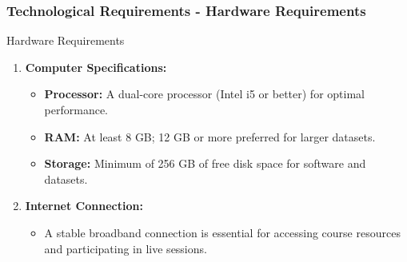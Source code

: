 \documentclass[aspectratio=169]{beamer}
\begin{document}
\begin{frame}[fragile]
    \frametitle{Technological Requirements - Hardware Requirements}
    \begin{block}{Hardware Requirements}
        \begin{enumerate}
            \item \textbf{Computer Specifications:}
            \begin{itemize}
                \item \textbf{Processor:} A dual-core processor (Intel i5 or better) for optimal performance.
                \item \textbf{RAM:} At least 8 GB; 12 GB or more preferred for larger datasets.
                \item \textbf{Storage:} Minimum of 256 GB of free disk space for software and datasets.
            \end{itemize}
            \item \textbf{Internet Connection:}
            \begin{itemize}
                \item A stable broadband connection is essential for accessing course resources and participating in live sessions.
            \end{itemize}
        \end{enumerate}
    \end{block}
\end{frame}
\end{document}
